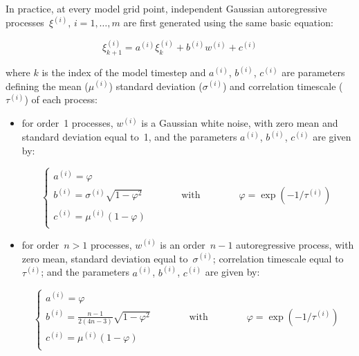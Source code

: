 \documentclass[../main/NEMO_manual]{subfiles}
\begin{document}
In practice, at every model grid point,
independent Gaussian autoregressive processes~$\xi^{(i)},\,i=1,\ldots,m$ are first generated using
the same basic equation:

\begin{equation}
  \label{eq:autoreg}
  \xi^{(i)}_{k+1} = a^{(i)} \xi^{(i)}_k + b^{(i)} w^{(i)} + c^{(i)}
\end{equation}

\noindent
where $k$ is the index of the model timestep and
$a^{(i)}$, $b^{(i)}$, $c^{(i)}$ are parameters defining the mean ($\mu^{(i)}$) standard deviation ($\sigma^{(i)}$) and
correlation timescale ($\tau^{(i)}$) of each process:

\begin{itemize}
\item
  for order~1 processes, $w^{(i)}$ is a Gaussian white noise, with zero mean and standard deviation equal to~1,
  and the parameters $a^{(i)}$, $b^{(i)}$, $c^{(i)}$ are given by:

  \[
    \left\{
      \begin{array}{l}
        a^{(i)} = \varphi \\
        b^{(i)} = \sigma^{(i)} \sqrt{ 1 - \varphi^2 }        \qquad\qquad\mbox{with}\qquad\qquad \varphi = \exp \left( - 1 / \tau^{(i)} \right) \\
        c^{(i)} = \mu^{(i)} \left( 1 - \varphi \right) \\
      \end{array}
    \right.
  \]

\item
  for order~$n>1$ processes, $w^{(i)}$ is an order~$n-1$ autoregressive process, with zero mean,
  standard deviation equal to~$\sigma^{(i)}$;
  correlation timescale equal to~$\tau^{(i)}$;
  and the parameters $a^{(i)}$, $b^{(i)}$, $c^{(i)}$ are given by:

  \begin{equation}
    \label{eq:ord2}
    \left\{
      \begin{array}{l}
        a^{(i)} = \varphi \\
        b^{(i)} = \frac{n-1}{2(4n-3)} \sqrt{ 1 - \varphi^2 }
        \qquad\qquad\mbox{with}\qquad\qquad
        \varphi = \exp \left( - 1 / \tau^{(i)} \right) \\
        c^{(i)} = \mu^{(i)} \left( 1 - \varphi \right) \\
      \end{array}
    \right.
  \end{equation}

\end{itemize}
\end{document}
